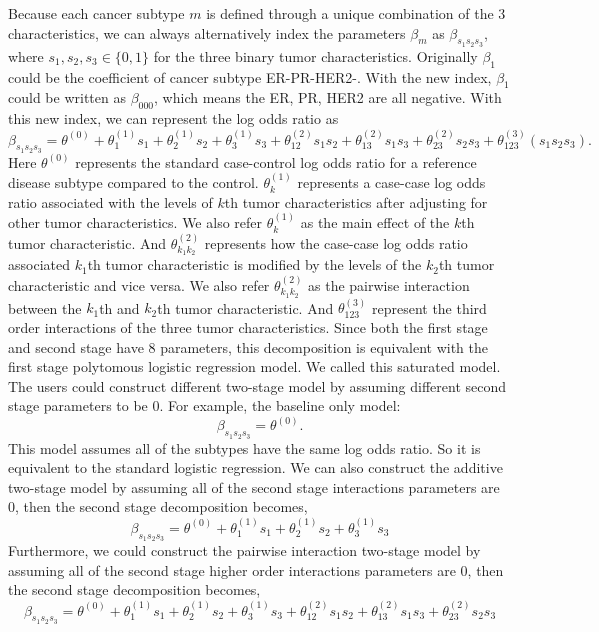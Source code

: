 \documentclass[11pt,]{article}
\begin{document}
Because each cancer subtype \(m\) is defined through a unique
combination of the 3 characteristics, we can always alternatively index
the parameters \(\beta_m\) as \(\beta_{s_1s_2s_3}\), where
\(s_1,s_2,s_3\in\{0,1\}\) for the three binary tumor characteristics.
Originally \(\beta_1\) could be the coefficient of cancer subtype
ER-PR-HER2-. With the new index, \(\beta_1\) could be written as
\(\beta_{000}\), which means the ER, PR, HER2 are all negative. With
this new index, we can represent the log odds ratio as
\[\beta_{s_{1}s_{2}s_{3}}=\theta^{(0)}+\theta_{1}^{(1)}s_{1}+\theta_{2}^{(1)}s_{2}+\theta_{3}^{(1)}s_{3}+\theta_{12}^{(2)}s_{1}s_{2}+\theta_{13}^{(2)}s_{1}s_{3}+\theta_{23}^{(2)}s_{2}s_{3}
+\theta_{123}^{(3)}(s_{1}s_{2}s_{3}).\] Here \(\theta^{(0)}\) represents
the standard case-control log odds ratio for a reference disease subtype
compared to the control. \(\theta_{k}^{(1)}\) represents a case-case log
odds ratio associated with the levels of \(k\)th tumor characteristics
after adjusting for other tumor characteristics. We also refer
\(\theta_{k}^{(1)}\) as the main effect of the \(k\)th tumor
characteristic. And \(\theta_{k_1k_2}^{(2)}\) represents how the
case-case log odds ratio associated \(k_1\)th tumor characteristic is
modified by the levels of the \(k_2\)th tumor characteristic and vice
versa. We also refer \(\theta_{k_1k_2}^{(2)}\) as the pairwise
interaction between the \(k_1\)th and \(k_2\)th tumor characteristic.
And \(\theta_{123}^{(3)}\) represent the third order interactions of the
three tumor characteristics. Since both the first stage and second stage
have 8 parameters, this decomposition is equivalent with the first stage
polytomous logistic regression model. We called this saturated model.
The users could construct different two-stage model by assuming
different second stage parameters to be 0. For example, the baseline
only model: \[\beta_{s_{1}s_{2}s_{3}}=\theta^{(0)}.\] This model assumes
all of the subtypes have the same log odds ratio. So it is equivalent to
the standard logistic regression. We can also construct the additive
two-stage model by assuming all of the second stage interactions
parameters are 0, then the second stage decomposition becomes,
\[\beta_{s_{1}s_{2}s_{3}}=\theta^{(0)}+\theta_{1}^{(1)}s_{1}+\theta_{2}^{(1)}s_{2}+\theta_{3}^{(1)}s_{3}\]
Furthermore, we could construct the pairwise interaction two-stage model
by assuming all of the second stage higher order interactions parameters
are 0, then the second stage decomposition becomes,
\[\beta_{s_{1}s_{2}s_{3}}=\theta^{(0)}+\theta_{1}^{(1)}s_{1}+\theta_{2}^{(1)}s_{2}+\theta_{3}^{(1)}s_{3}+\theta_{12}^{(2)}s_{1}s_{2}+\theta_{13}^{(2)}s_{1}s_{3}+\theta_{23}^{(2)}s_{2}s_{3}\]
\end{document}
